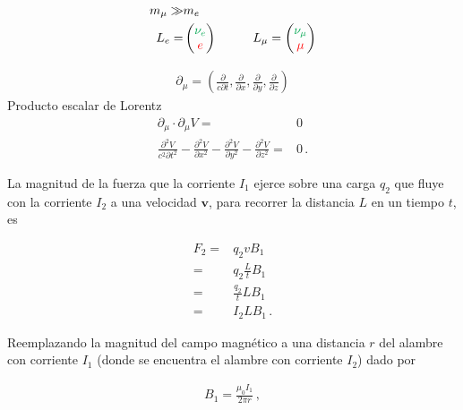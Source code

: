 \documentclass[11pt,a4paper]{book}
\begin{document}
\begin{align*}
m_\mu \gg& m_e\\
    L_e =&\begin{pmatrix}
      \color{Green}  \nu_e\\
       \color{red} e
    \end{pmatrix} \hspace{1cm}
    L_\mu= \begin{pmatrix}
      \color{Green}  \nu_\mu\\
       \color{red} \mu
    \end{pmatrix}
\end{align*}

\begin{align*}
    \partial_\mu = \left(\frac{\partial}{c\partial t},
    \frac{\partial}{\partial x},
    \frac{\partial}{\partial y},
    \frac{\partial}{\partial z}\right)
\end{align*}
\hspace{5cm}Producto escalar de Lorentz
\begin{align*}
    \partial_\mu\cdot \partial_\mu V =& 0\\ 
    \frac{\partial^2 V}{c^2\partial t^2}-
    \frac{\partial^2 V}{\partial x^2}-
    \frac{\partial^2 V}{\partial y^2}-
    \frac{\partial^2 V}{\partial z^2} =& 0\,.
\end{align*}

\newpage
\def\mipa{11cm}
\begin{minipage}{\mipa}
La magnitud de la fuerza que la corriente $I_1$ ejerce sobre una carga $q_2$ que fluye con la corriente $I_2$ a una velocidad $\boldsymbol{v}$, para recorrer la distancia $L$ en un tiempo $t$, es
\end{minipage}

\begin{align*}
F_2 =& q_2 v B_1\\
=& q_2\frac{L}{t} B_1\\
=& \frac{q_2}{t} L B_1\\
=& I_2 L B_1\,.
\end{align*}

\begin{minipage}{\mipa}
Reemplazando la magnitud del campo magnético 
a una distancia $r$ del alambre con corriente $I_1$ (donde se encuentra el alambre con corriente $I_2$) dado por
\end{minipage}

\begin{align*}
    B_1 = \frac{\mu_0 I_1}{2\pi r}\,,
\end{align*}
\end{document}
